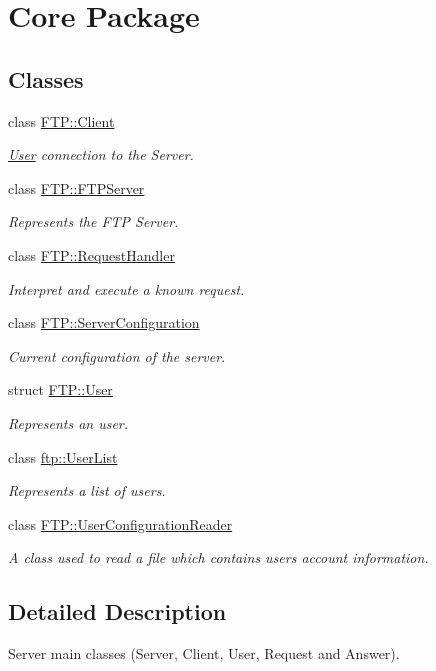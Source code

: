 \hypertarget{group__core}{}\section{Core Package}
\label{group__core}
\subsection*{Classes}
\begin{DoxyCompactItemize}
\item 
class \hyperlink{classFTP_1_1Client}{F\+T\+P\+::\+Client}
\begin{DoxyCompactList}\small\item\em \hyperlink{structFTP_1_1User}{User} connection to the Server. \end{DoxyCompactList}\item 
class \hyperlink{classFTP_1_1FTPServer}{F\+T\+P\+::\+F\+T\+P\+Server}
\begin{DoxyCompactList}\small\item\em Represents the F\+T\+P Server. \end{DoxyCompactList}\item 
class \hyperlink{classFTP_1_1RequestHandler}{F\+T\+P\+::\+Request\+Handler}
\begin{DoxyCompactList}\small\item\em Interpret and execute a known request. \end{DoxyCompactList}\item 
class \hyperlink{classFTP_1_1ServerConfiguration}{F\+T\+P\+::\+Server\+Configuration}
\begin{DoxyCompactList}\small\item\em Current configuration of the server. \end{DoxyCompactList}\item 
struct \hyperlink{structFTP_1_1User}{F\+T\+P\+::\+User}
\begin{DoxyCompactList}\small\item\em Represents an user. \end{DoxyCompactList}\item 
class \hyperlink{classftp_1_1UserList}{ftp\+::\+User\+List}
\begin{DoxyCompactList}\small\item\em Represents a list of users. \end{DoxyCompactList}\item 
class \hyperlink{classFTP_1_1UserConfigurationReader}{F\+T\+P\+::\+User\+Configuration\+Reader}
\begin{DoxyCompactList}\small\item\em A class used to read a file which contains user\textquotesingle{}s account information. \end{DoxyCompactList}\end{DoxyCompactItemize}


\subsection{Detailed Description}
Server main classes (Server, Client, User, Request and Answer). 
